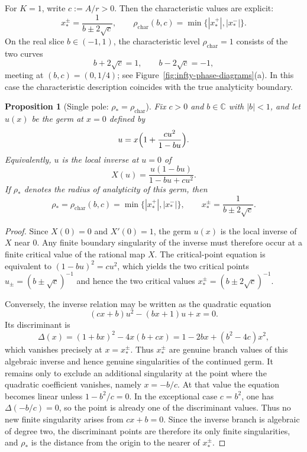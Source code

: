 \documentclass[11pt]{amsart}
\numberwithin{equation}{section}
\theoremstyle{plain}
\newtheorem{proposition}[theorem]{Proposition}
\theoremstyle{definition}
\theoremstyle{remark}
\begin{document}
For \(K=1\), write \(c:=A/r>0\). Then the characteristic values are explicit:
\begin{equation}\label{eq:xstar-one-pole-explicit}
x_*^\pm=\frac{1}{b\pm2\sqrt c},
\qquad
\rho_{\mathrm{char}}(b,c)=\min\{|x_*^+|,|x_*^-|\}.
\end{equation}
On the real slice \(b\in(-1,1)\), the characteristic level \(\rho_{\mathrm{char}}=1\)
consists of the two curves
\begin{equation}\label{eq:pole-critical-curves}
b+2\sqrt c=1,
\qquad
b-2\sqrt c=-1,
\end{equation}
meeting at \((b,c)=(0,1/4)\); see
Figure~\ref{fig:infty-phase-diagrams}\textup{(a)}.
In this case the characteristic description coincides with the true analyticity boundary.

\begin{proposition}[Single pole: \(\rho_*=\rho_{\mathrm{char}}\)]
\label{prop:single-pole-rho-star}
Fix \(c>0\) and \(b\in\mathbb C\) with \(|b|<1\), and let \(u(x)\) be the germ at \(x=0\)
defined by
\[
u=x\Bigl(1+\frac{c u^2}{1-bu}\Bigr).
\]
Equivalently, \(u\) is the local inverse at \(u=0\) of
\[
X(u)=\frac{u(1-bu)}{1-bu+c u^2}.
\]
If \(\rho_*\) denotes the radius of analyticity of this germ, then
\[
\rho_*=\rho_{\mathrm{char}}(b,c)=\min\{|x_*^+|,|x_*^-|\},
\qquad
x_*^\pm=\frac{1}{b\pm2\sqrt c}.
\]
\end{proposition}

\begin{proof}
Since \(X(0)=0\) and \(X'(0)=1\), the germ \(u(x)\) is the local inverse of \(X\) near
\(0\). Any finite boundary singularity of the inverse must therefore occur at a finite
critical value of the rational map \(X\). The critical-point equation is equivalent to
\((1-bu)^2=c u^2\), which yields the two critical points \(u_\pm=(b\pm\sqrt c)^{-1}\) and
hence the two critical values \(x_*^\pm=(b\pm2\sqrt c)^{-1}\).

Conversely, the inverse relation may be written as the quadratic equation
\[
(c x+b)u^2-(b x+1)u+x=0.
\]
Its discriminant is
\[
\Delta(x)=(1+b x)^2-4x(b+c x)=1-2b x+(b^2-4c)x^2,
\]
which vanishes precisely at \(x=x_*^\pm\). Thus \(x_*^\pm\) are genuine branch values of
this algebraic inverse and hence genuine singularities of the continued germ. It remains only to exclude an additional singularity at the point where the
quadratic coefficient vanishes, namely \(x=-b/c\). At that value the equation becomes
linear unless \(1-b^2/c=0\). In the exceptional case \(c=b^2\), one has
\(\Delta(-b/c)=0\), so the point is already one of the discriminant values. Thus no new
finite singularity arises from \(cx+b=0\). Since the inverse branch is algebraic of
degree two, the discriminant points are therefore its only finite singularities, and
\(\rho_*\) is the distance from the origin to the nearer of \(x_*^\pm\).
\end{proof}
\end{document}
